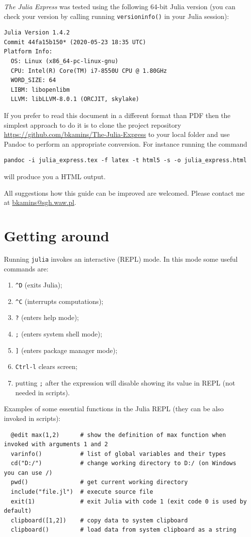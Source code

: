 \documentclass[10pt,a4paper]{article}
\begin{document}
\emph{The Julia Express} was tested using the following 64-bit Julia version
(you can check your version by calling running \lstinline|versioninfo()| in your
Julia session):
\begin{lstlisting}
Julia Version 1.4.2
Commit 44fa15b150* (2020-05-23 18:35 UTC)
Platform Info:
  OS: Linux (x86_64-pc-linux-gnu)
  CPU: Intel(R) Core(TM) i7-8550U CPU @ 1.80GHz
  WORD_SIZE: 64
  LIBM: libopenlibm
  LLVM: libLLVM-8.0.1 (ORCJIT, skylake)
\end{lstlisting}



If you prefer to read this document in a different format than PDF then the
simplest approach to do it is to clone the project repository
\url{https://github.com/bkamins/The-Julia-Express} to your local folder and use
Pandoc to perform an appropriate conversion. For instance running the command
\begin{lstlisting}
pandoc -i julia_express.tex -f latex -t html5 -s -o julia_express.html
\end{lstlisting}
will produce you a HTML output.

All suggestions how this guide can be improved are welcomed. Please contact me at \href{mailto:bkamins@sgh.waw.pl}{bkamins@sgh.waw.pl}.

\section{Getting around}

Running \lstinline|julia| invokes an interactive (REPL) mode.
In this mode some useful commands are:
\begin{enumerate}[label=\arabic*),nolistsep]
  \item \lstinline|^D| (exits Julia);
  \item \lstinline|^C| (interrupts computations);
  \item \lstinline|?| (enters help mode);
  \item \lstinline|;| (enters system shell mode);
  \item \lstinline|]| (enters package manager mode);
  \item \lstinline|Ctrl-l| clears screen;
  \item putting \lstinline|;| after the expression will disable showing its value
        in REPL (not needed in scripts).
\end{enumerate}

Examples of some essential functions in the Julia REPL (they can be also invoked in scripts):
\begin{lstlisting}
  @edit max(1,2)      # show the definition of max function when invoked with arguments 1 and 2
  varinfo()           # list of global variables and their types
  cd("D:/")           # change working directory to D:/ (on Windows you can use /)
  pwd()               # get current working directory
  include("file.jl")  # execute source file
  exit(1)             # exit Julia with code 1 (exit code 0 is used by default)
  clipboard([1,2])    # copy data to system clipboard
  clipboard()         # load data from system clipboard as a string
\end{lstlisting}
\end{document}
